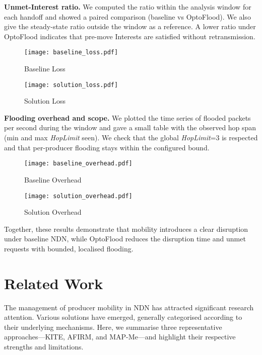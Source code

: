 \documentclass[10pt,conference]{IEEEtran}
\begin{document}
\textbf{Unmet-Interest ratio.}
We computed the ratio within the analysis window for each handoff and showed a paired comparison (baseline vs OptoFlood). We also give the steady-state ratio outside the window as a reference. A lower ratio under OptoFlood indicates that pre-move Interests are satisfied without retransmission.
\begin{figure}
    \centering
    \texttt{[image: baseline\_loss.pdf]}
    \caption{Baseline Loss}
    \label{fig:baseline_loss}
\end{figure}
\begin{figure}
    \centering
    \texttt{[image: solution\_loss.pdf]}
    \caption{Solution Loss}
    \label{fig:solution_loss}
\end{figure}

\textbf{Flooding overhead and scope.}
We plotted the time series of flooded packets per second during the window and gave a small table with the observed hop span (min and max \textit{HopLimit} seen). We check that the global \textit{HopLimit}=3 is respected and that per-producer flooding stays within the configured bound.
\begin{figure}
    \centering
    \texttt{[image: baseline\_overhead.pdf]}
    \caption{Baseline Overhead}
    \label{fig:baseline_overhead}
\end{figure}
\begin{figure}
    \centering
    \texttt{[image: solution\_overhead.pdf]}
    \caption{Solution Overhead}
    \label{fig:solution_overhead}
\end{figure}

Together, these results demonstrate that mobility introduces a clear disruption under baseline NDN, while OptoFlood reduces the disruption time and unmet requests with bounded, localised flooding.

\section{Related Work}
\label{sec:related}

The management of producer mobility in NDN has attracted significant research attention. Various solutions have emerged, generally categorised according to their underlying mechanisms. Here, we summarise three representative approaches—KITE, AFIRM, and MAP-Me—and highlight their respective strengths and limitations.
\end{document}
